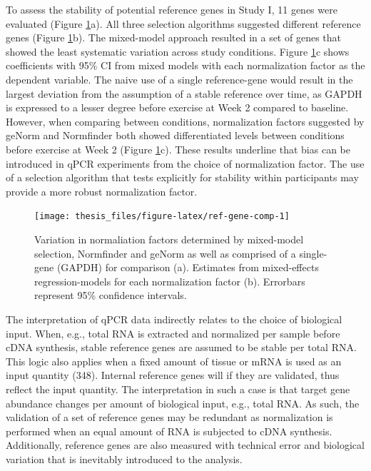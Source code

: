 \documentclass[twoside,10pt]{gihclass} %
\begin{document}
To assess the stability of potential reference genes in Study I, 11 genes were evaluated (Figure \ref{fig:ref-gene-comp}a). All three selection algorithms suggested different reference genes (Figure \ref{fig:ref-gene-comp}b). The mixed-model approach resulted in a set of genes that showed the least systematic variation across study conditions. Figure \ref{fig:ref-gene-comp}c shows coefficients with 95\% CI from mixed models with each normalization factor as the dependent variable. The naive use of a single reference-gene would result in the largest deviation from the assumption of a stable reference over time, as GAPDH is expressed to a lesser degree before exercise at Week 2 compared to baseline. However, when comparing between conditions, normalization factors suggested by geNorm and Normfinder both showed differentiated levels between conditions before exercise at Week 2 (Figure \ref{fig:ref-gene-comp}c). These results underline that bias can be introduced in qPCR experiments from the choice of normalization factor. The use of a selection algorithm that tests explicitly for stability within participants may provide a more robust normalization factor.
\begin{figure}

{\centering \texttt{[image: thesis\_files/figure-latex/ref-gene-comp-1]} 

}

\caption[Reference gene selection in Study I]{Variation in normaliation factors determined by mixed-model selection, Normfinder and geNorm as well as comprised of a single-gene (GAPDH) for comparison (a). Estimates from mixed-effects regression-models for each normalization factor (b). Errorbars represent 95\% confidence intervals.}\label{fig:ref-gene-comp}
\end{figure}
The interpretation of qPCR data indirectly relates to the choice of biological input. When, e.g., total RNA is extracted and normalized per sample before cDNA synthesis, stable reference genes are assumed to be stable per total RNA. This logic also applies when a fixed amount of tissue or mRNA is used as an input quantity
(348).
Internal reference genes will if they are validated, thus reflect the input quantity. The interpretation in such a case is that target gene abundance changes per amount of biological input, e.g., total RNA.
As such, the validation of a set of reference genes may be redundant as normalization is performed when an equal amount of RNA is subjected to cDNA synthesis.
Additionally, reference genes are also measured with technical error and biological variation that is inevitably introduced to the analysis.
\end{document}
